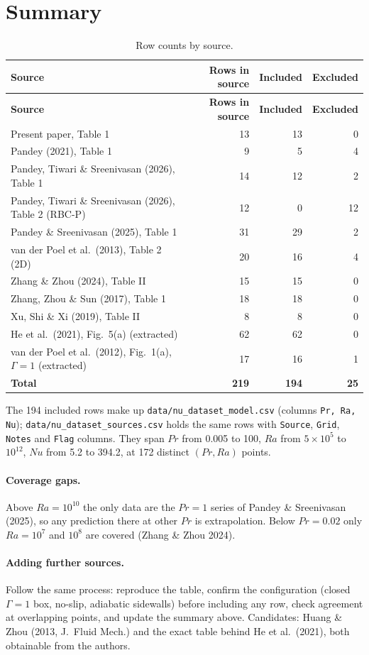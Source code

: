 \documentclass[11pt]{article}
\begin{document}
\section{Summary}
\begin{longtable}{p{8.6cm} r r r}
\caption{Row counts by source.}\label{tab:summary}\\
\toprule
\textbf{Source} & \textbf{Rows in source} & \textbf{Included} & \textbf{Excluded} \\
\midrule
\endfirsthead
\toprule
\textbf{Source} & \textbf{Rows in source} & \textbf{Included} & \textbf{Excluded} \\
\midrule
\endhead
\bottomrule
\endfoot
Present paper, Table 1 & 13 & 13 & 0 \\
Pandey (2021), Table 1 & 9 & 5 & 4 \\
Pandey, Tiwari \& Sreenivasan (2026), Table 1 & 14 & 12 & 2 \\
Pandey, Tiwari \& Sreenivasan (2026), Table 2 (RBC-P) & 12 & 0 & 12 \\
Pandey \& Sreenivasan (2025), Table 1 & 31 & 29 & 2 \\
van der Poel et al.\ (2013), Table 2 (2D) & 20 & 16 & 4 \\
Zhang \& Zhou (2024), Table II & 15 & 15 & 0 \\
Zhang, Zhou \& Sun (2017), Table 1 & 18 & 18 & 0 \\
Xu, Shi \& Xi (2019), Table II & 8 & 8 & 0 \\
He et al.\ (2021), Fig.~5(a) (extracted) & 62 & 62 & 0 \\
van der Poel et al.\ (2012), Fig.~1(a), $\Gamma=1$ (extracted) & 17 & 16 & 1 \\
\midrule
\textbf{Total} & \textbf{219} & \textbf{194} & \textbf{25} \\
\end{longtable}
\noindent The 194 included rows make up \texttt{data/nu\_dataset\_model.csv}
(columns \texttt{Pr, Ra, Nu}); \texttt{data/nu\_dataset\_sources.csv} holds
the same rows with \texttt{Source}, \texttt{Grid}, \texttt{Notes} and
\texttt{Flag} columns. They span $Pr$ from 0.005 to 100, $Ra$ from $5\times10^{5}$ to $10^{12}$, $Nu$ from 5.2 to 394.2, at 172 distinct
$(Pr, Ra)$ points.

\paragraph{Coverage gaps.} Above $Ra=10^{10}$ the only data are the
$Pr=1$ series of Pandey \& Sreenivasan (2025), so any prediction there at
other $Pr$ is extrapolation. Below $Pr=0.02$ only $Ra=10^7$ and $10^8$ are
covered (Zhang \& Zhou 2024).

\paragraph{Adding further sources.} Follow the same process: reproduce the
table, confirm the configuration (closed $\Gamma=1$ box, no-slip, adiabatic
sidewalls) before including any row, check agreement at overlapping points,
and update the summary above. Candidates: Huang \& Zhou (2013, J.\ Fluid Mech.)
and the exact table behind He et al.\ (2021), both obtainable
from the authors.
\end{document}
